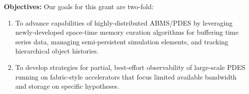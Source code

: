 \vspace{.5em}
\noindent\textbf{Objectives:} Our goals for this grant are two-fold:
\begin{enumerate}%
\item To advance capabilities of highly-distributed ABMS/PDES by leveraging newly-developed space-time memory curation algorithms for buffering time series data, managing semi-persistent simulation elements, and tracking hierarchical object histories.%
\item To develop strategies for partial, best-effort observability of large-scale PDES running on fabric-style accelerators that focus limited available bandwidth and storage on specific hypotheses.
\end{enumerate}





